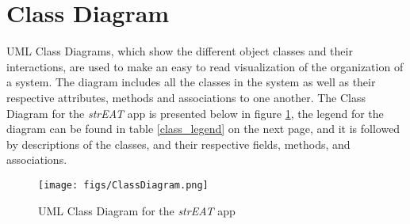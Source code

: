 \section{Class Diagram}
UML Class Diagrams, which show the different object classes and their interactions, are used to make an easy to read visualization of the organization of a system. The diagram includes all the classes in the system as well as their respective attributes, methods and associations to one another. The Class Diagram for the \textit{strEAT} app is presented below in figure \ref{ClassDiagram}, the legend for the diagram can be found in table \ref{class_legend} on the next page, and it is followed by descriptions of the classes, and their respective fields, methods, and associations.

\begin{figure}[h!]
  \centering
  \texttt{[image: figs/ClassDiagram.png]}
  \caption{UML Class Diagram for the \textit{strEAT} app}
  \label{ClassDiagram}
\end{figure}
\onecolumn
\pagebreak

